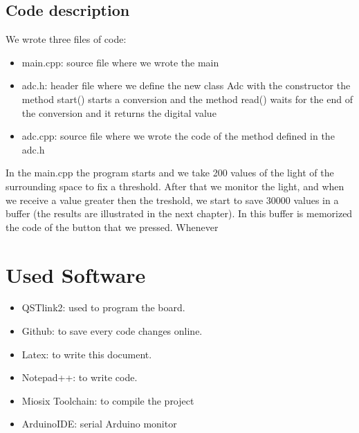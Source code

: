 \documentclass[18pt,oneside,a4paper, titlepage]{article}
\begin{document}
	\subsection{Code description}
		We wrote three files of code:
		\begin{itemize}
			\item main.cpp: source file where we wrote the main
			\item adc.h: header file where we define the new class Adc with the constructor the method start() starts a conversion and the method read() waits for the end of the conversion and it returns the digital value
			\item adc.cpp: source file where we wrote the code of the method defined in the adc.h
		\end{itemize}
		In the main.cpp the program starts and we take 200 values of the light of the surrounding space to fix a threshold. After that we monitor the light, and when we receive a value greater then the treshold, we start to save 30000 values in a buffer (the results are illustrated in the next chapter). In this buffer is memorized the code of the button that we pressed. Whenever 
\newpage
		
\newpage
\section{Used Software}
\begin{itemize}
	\item QSTlink2: used to program the board.
	\item Github: to save every code changes  online.
	\item Latex: to write this document.
	\item Notepad++: to write code.
	\item Miosix Toolchain: to compile the project
	\item ArduinoIDE: serial Arduino monitor 

\end{itemize}
\end{document}
